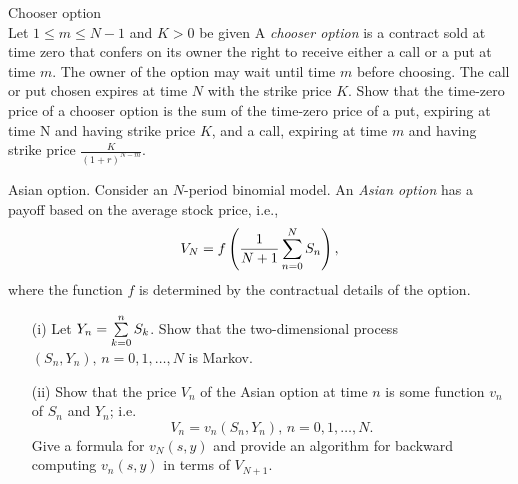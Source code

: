 \begin{problem}
 Chooser option \\
 Let $1\le m\le N-1$ and $K>0$ be given
A \emph{chooser option} is a contract sold at time zero that confers on its owner
the right to receive either a call or a put at time $m$. The owner of the option may
wait until time $m$ before choosing. The call or put chosen expires at time $N$ with
the strike price $K$. Show that the time-zero price of a chooser option is the sum of
the time-zero price of a put, expiring at time N and having strike price $K$, and a call,
expiring at time $m$ and having strike price $\frac{K}{(1+r)^{N-m}}.$

\begin{sol}

\end{sol}
\end{problem}

\begin{problem}
Asian option. Consider an $N$-period binomial model.
An \emph{Asian option} has a payoff based on the average stock price, i.e.,
\[
V_N=f\left(\frac{1}{N+1}\sum\limits_{n=0}^{N} S_n \right),
\]
\ni where the function $f$ is determined by the contractual details of the option.
\begin{enumerate}
\item[(i)] Let $Y_n=\sum\limits_{k=0}^{n} S_k$. Show that the two-dimensional process
$(S_n,Y_n),\, n=0,1,\dots,N$ is Markov.

\item[(ii)] Show that the price $V_n$ of the Asian option at time $n$
is some function $v_n$ of $S_n$ and $Y_n$; i.e.
\[
V_n=v_n(S_n,Y_n),\, n=0,1,\dots,N.
\]
\ni Give a formula for $v_N(s,y)$ and provide an algorithm for backward computing
$v_n(s,y)$ in terms of $V_{N+1}.$
\end{enumerate}


\begin{sol}

\end{sol}
\end{problem}

